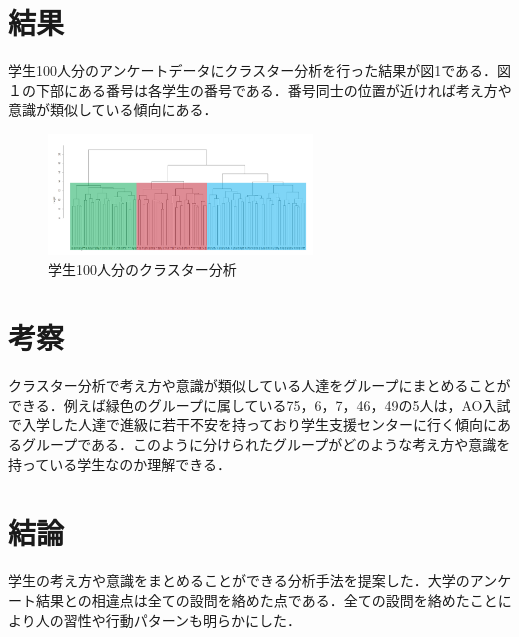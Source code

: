 \documentclass[uplatex,twocolumn,dvipdfmx]{jsarticle}
\begin{document}
\section{結果}
学生100人分のアンケートデータにクラスター分析を行った結果が図1である．図１の下部にある番号は各学生の番号である．番号同士の位置が近ければ考え方や意識が類似している傾向にある．
\begin{figure}[h]
\centering
\includegraphics[width=7cm]{clusterresults.pdf}
\caption{学生100人分のクラスター分析}\label{学生100人分のクラスター分析}
\end{figure}
\section{考察}
クラスター分析で考え方や意識が類似している人達をグループにまとめることができる．例えば緑色のグループに属している75，6，7，46，49の5人は，AO入試で入学した人達で進級に若干不安を持っており学生支援センターに行く傾向にあるグループである．このように分けられたグループがどのような考え方や意識を持っている学生なのか理解できる．
\section{結論}
学生の考え方や意識をまとめることができる分析手法を提案した．大学のアンケート結果との相違点は全ての設問を絡めた点である．全ての設問を絡めたことにより人の習性や行動パターンも明らかにした．

\end{document}
